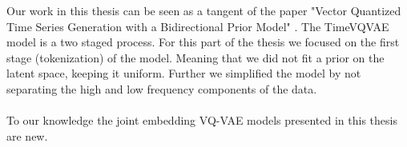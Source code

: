 \documentclass[../../thesis.tex]{subfiles}
\begin{document}



Our work in this thesis can be seen as a tangent of the paper "Vector Quantized Time Series Generation with a Bidirectional Prior Model" \cite{TimeVQVAE}. The TimeVQVAE model is a two staged process. For this part of the thesis we focused on the first stage (tokenization) of the model. Meaning that we did not fit a prior on the latent space, keeping it uniform. Further we simplified the model by not separating the high and low frequency components of the data.\\\\

To our knowledge the joint embedding VQ-VAE models presented in this thesis are new.
\end{document}

